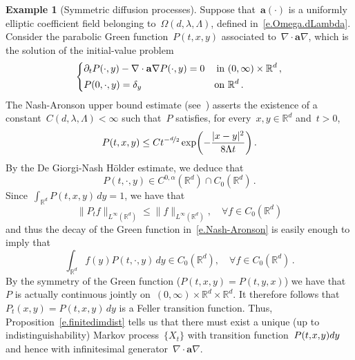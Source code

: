 \documentclass[11pt,twoside]{article} %
\numberwithin{equation}{section}
\theoremstyle{definition}
\newtheorem{example}[theorem]{Example}
\let\originalleft\left
\let\originalright\right
\renewcommand{\left}{\mathopen{}\mathclose\bgroup\originalleft}
\renewcommand{\right}{\aftergroup\egroup\originalright}
\newcommand*{\Rd}{\ensuremath{\mathbb{R}^d}}
\renewcommand{\a}{\mathbf{a}}
\begin{document}
\begin{example}[Symmetric diffusion processes]
\label{ex.symmetric.diffusion}
Suppose that~$\a(\cdot)$ is a uniformly elliptic coefficient field belonging to~$\Omega(d,\lambda,\Lambda)$, defined in~\eqref{e.Omega.dLambda}. 
Consider the parabolic Green function~$P(t,x,y)$ associated to~$\nabla \cdot \a\nabla$, which is the solution of the initial-value problem
\begin{equation*}
\left\{
\begin{aligned}
& \partial_t P(\cdot,y) - \nabla \cdot \a\nabla P(\cdot,y) = 0 & \mbox{in} & \ (0,\infty) \times \Rd\,, 
\\ & 
P(0,\cdot,y) = \delta_y & \mbox{on} & \ \Rd\,.
\end{aligned}
\right.
\end{equation*}
The Nash-Aronson upper bound estimate  (see~\cite[Lemma E.8]{AKMBook}) asserts the existence of a constant~$C(d,\lambda,\Lambda)<\infty$ such that~$P$ satisfies, for every~$x,y \in\Rd$ and~$t>0$, 
\begin{equation}
\label{e.Nash-Aronson}
P(t,x,y) \leq 
Ct^{-\nicefrac d2} 
\exp\biggl( - \frac{ |x-y|^2 }{8\Lambda t} \biggr)
\,.
\end{equation}
By the De Giorgi-Nash H\"older estimate, we deduce that 
\begin{equation*}
P (t,\cdot,y) \in C^{0,\alpha} (\Rd) \cap C_0(\Rd)\,.
\end{equation*}
Since~$\int_{\Rd} P(t,x,y)\,dy = 1$, we have that 
\begin{equation*}
\| P_t f \|_{L^\infty(\Rd)} 
\leq 
\| f \|_{L^\infty(\Rd)}, \quad \forall f \in C_0(\Rd)
\end{equation*}
and thus the decay of the Green function in~\eqref{e.Nash-Aronson} is easily enough to imply that
\begin{equation*}
\int_{\Rd} f(y) P(t,\cdot,y)\,dy  \in C_0(\Rd), \quad \forall f \in C_0(\Rd)
\,.
\end{equation*}
By the symmetry of the Green function ($P(t,x,y) = P(t,y,x)$) we have that~$P$ is actually continuous jointly on~$(0,\infty) \times\Rd \times \Rd$.
It therefore follows that~$P_t (x,y) = P(t,x,y)\,dy$ is a Feller transition function. Thus, Proposition~\ref{e.finitedimdist} tells us that there must exist a unique (up to indistinguishability) Markov process~$\{ X_t \}$ with transition function~$P(t,\hspace{-1pt} x, \hspace{-1pt} y)dy$ and hence with infinitesimal generator~$\nabla \cdot\a\nabla$. 


\end{example}
\end{document}

